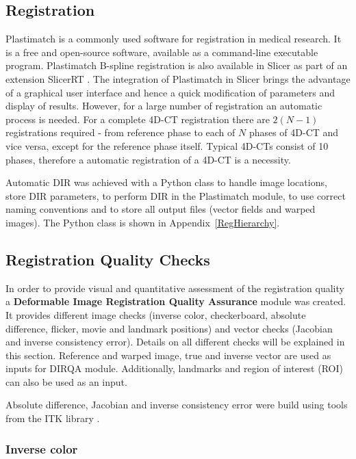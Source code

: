 \documentclass[type=dr, dr=rernat, accentcolor=tud7b,colorbacktitle, bigchapter, openright, twoside, 12pt ]{tudthesis}
\begin{document}
\subsection{Registration}
\label{RegistrationImplement}

Plastimatch \cite{Shackleford2010} is a commonly used software for registration in medical research. It is a free and open-source software, available as a command-line executable program. 
Plastimatch B-spline registration is also available in Slicer as part of an extension SlicerRT \cite{Pinter2012}.
The integration of Plastimatch in Slicer brings the advantage of a graphical user interface and hence a quick modification of parameters and display of results. 
However, for a large number of registration an automatic process is needed. For a complete 4D-CT registration there are $2(N-1)$ registrations required - from reference phase to each of $N$ phases of 4D-CT and vice versa, except for the reference phase itself. 
Typical 4D-CTs consist of 10 phases, therefore a automatic registration of a 4D-CT is a necessity.

Automatic DIR was achieved with a Python class to handle image locations, store DIR parameters, to perform DIR in the Plastimatch module, to use correct naming conventions and to store all output files (vector fields and warped images). 
The Python class is shown in Appendix~\ref{RegHierarchy}.


\subsection{Registration Quality Checks}
\label{DIRQA}

In order to provide visual and quantitative assessment of the registration quality a \textbf{Deformable Image Registration Quality Assurance} module was created. It provides different image checks (inverse color, checkerboard, absolute difference, flicker, movie and landmark positions) and vector checks (Jacobian and inverse consistency error). Details on all different checks will be explained in this section. Reference and warped image, true and inverse vector are used as inputs for DIRQA module. Additionally, landmarks and region of interest (ROI) can also be used as an input.

Absolute difference, Jacobian and inverse consistency error were build using tools from the ITK library \cite{Yoo2002}.

\subsubsection{Inverse color}
\label{Sec:FalseColor}
\end{document}
